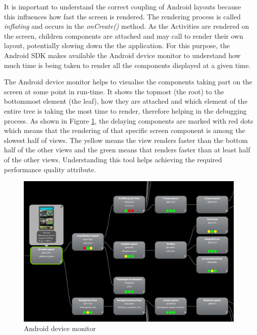It is important to understand the correct coupling of Android layouts because this influences how fast the screen is rendered. The rendering process is called \textit{inflating} and occurs in the \textit{onCreate()} method. As the Activities are rendered on the screen, children components are attached and may call to render their own layout, potentially slowing down the the application. For this purpose, the Android SDK makes available the Android device monitor to understand how much time is being taken to render all the components displayed at a given time. 

The Android device monitor helps to visualise the components taking part on the screen at some point in run-time. It shows  the topmost (the root) to the bottommost element (the leaf), how they are attached and which element of the entire tree is taking the most time to render, therefore helping in the debugging process. As shown in Figure \ref{fig:android_device_monitor}, the delaying components are marked with red dots which means that the rendering of that specific screen component is among the slowest half of views. The yellow means the view renders faster than the bottom half of the other views and the green means that renders faster than at least half of the other views. Understanding this tool helps achieving the required performance quality attribute. 

\begin{figure}[H]
\begin{adjustbox}{width=1\textwidth,center=\textwidth}
  \centering
  \includegraphics[scale=1]{images/android_device_monitor_2.png}
\end{adjustbox}
  \caption[Android device monitor]{Android device monitor}
  \label{fig:android_device_monitor}
\end{figure}

